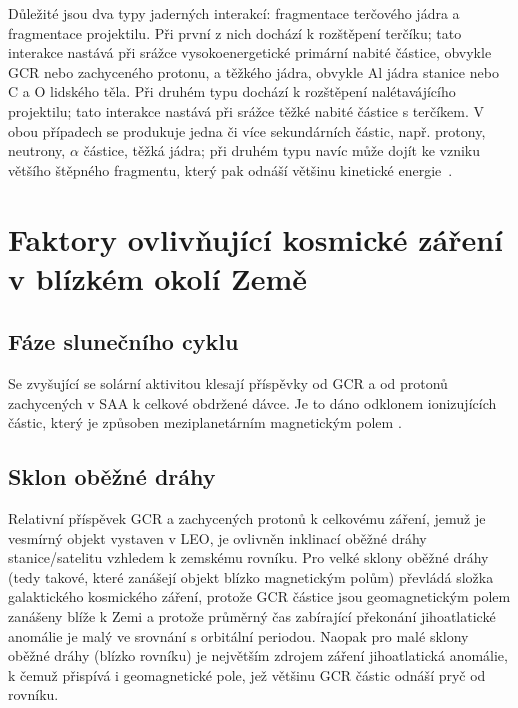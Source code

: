 Důležité jsou dva typy jaderných interakcí: fragmentace terčového jádra a fragmentace projektilu. Při první z nich dochází k rozštěpení terčíku; tato interakce nastává při srážce vysokoenergetické primární nabité částice, obvykle GCR nebo zachyceného protonu, a těžkého jádra, obvykle Al jádra stanice nebo C a O lidského těla. Při druhém typu dochází k rozštěpení nalétavájícího projektilu; tato interakce nastává při srážce těžké nabité částice s terčíkem. V obou případech se produkuje jedna či více sekundárních částic, např. protony, neutrony, $\alpha$ částice, těžká jádra; při druhém typu navíc může dojít ke vzniku většího štěpného fragmentu, který pak odnáší většinu kinetické energie~\cite{benton}. 
 


\section{Faktory ovlivňující kosmické záření v blízkém okolí Země}
\subsection{Fáze slunečního cyklu}\label{sec:kosmickeZareni_solar}
Se zvyšující se solární aktivitou klesají příspěvky od GCR a od protonů zachycených v SAA k celkové obdržené dávce. Je to dáno odklonem ionizujících částic, který je způsoben meziplanetárním magnetickým polem \cite{dosis}.
\subsection{Sklon oběžné dráhy}
Relativní příspěvek GCR a zachycených protonů k celkovému záření, jemuž je vesmírný objekt vystaven v LEO, je ovlivněn inklinací oběžné dráhy stanice/satelitu vzhledem k zemskému rovníku. Pro velké sklony oběžné dráhy (tedy takové, které zanášejí objekt blízko magnetickým polům) převládá složka galaktického kosmického záření, protože GCR částice jsou geomagnetickým polem zanášeny blíže k Zemi a protože průměrný čas zabírající překonání jihoatlatické anomálie je malý ve srovnání s orbitální periodou. Naopak pro malé sklony oběžné dráhy (blízko rovníku) je největším zdrojem záření jihoatlatická anomálie, k čemuž přispívá i geomagnetické pole, jež většinu GCR částic odnáší pryč od rovníku.
